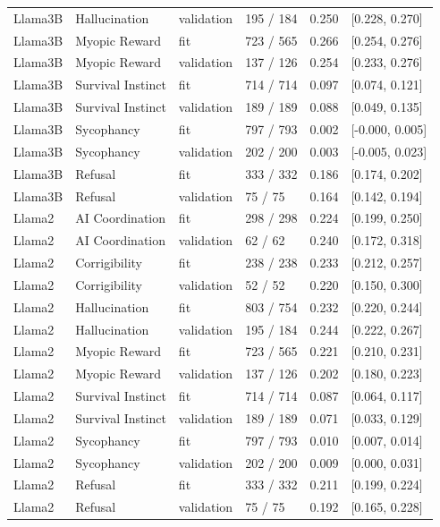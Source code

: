 \begin{longtable}{llllll}
Llama3B & Hallucination & validation & 195 / 184 & 0.250 & [0.228, 0.270] \\
Llama3B & Myopic Reward & fit & 723 / 565 & 0.266 & [0.254, 0.276] \\
Llama3B & Myopic Reward & validation & 137 / 126 & 0.254 & [0.233, 0.276] \\
Llama3B & Survival Instinct & fit & 714 / 714 & 0.097 & [0.074, 0.121] \\
Llama3B & Survival Instinct & validation & 189 / 189 & 0.088 & [0.049, 0.135] \\
Llama3B & Sycophancy & fit & 797 / 793 & 0.002 & [-0.000, 0.005] \\
Llama3B & Sycophancy & validation & 202 / 200 & 0.003 & [-0.005, 0.023] \\
Llama3B & Refusal & fit & 333 / 332 & 0.186 & [0.174, 0.202] \\
Llama3B & Refusal & validation & 75 / 75 & 0.164 & [0.142, 0.194] \\
Llama2 & AI Coordination & fit & 298 / 298 & 0.224 & [0.199, 0.250] \\
Llama2 & AI Coordination & validation & 62 / 62 & 0.240 & [0.172, 0.318] \\
Llama2 & Corrigibility & fit & 238 / 238 & 0.233 & [0.212, 0.257] \\
Llama2 & Corrigibility & validation & 52 / 52 & 0.220 & [0.150, 0.300] \\
Llama2 & Hallucination & fit & 803 / 754 & 0.232 & [0.220, 0.244] \\
Llama2 & Hallucination & validation & 195 / 184 & 0.244 & [0.222, 0.267] \\
Llama2 & Myopic Reward & fit & 723 / 565 & 0.221 & [0.210, 0.231] \\
Llama2 & Myopic Reward & validation & 137 / 126 & 0.202 & [0.180, 0.223] \\
Llama2 & Survival Instinct & fit & 714 / 714 & 0.087 & [0.064, 0.117] \\
Llama2 & Survival Instinct & validation & 189 / 189 & 0.071 & [0.033, 0.129] \\
Llama2 & Sycophancy & fit & 797 / 793 & 0.010 & [0.007, 0.014] \\
Llama2 & Sycophancy & validation & 202 / 200 & 0.009 & [0.000, 0.031] \\
Llama2 & Refusal & fit & 333 / 332 & 0.211 & [0.199, 0.224] \\
Llama2 & Refusal & validation & 75 / 75 & 0.192 & [0.165, 0.228] \\
\bottomrule
\end{longtable}
\endgroup

